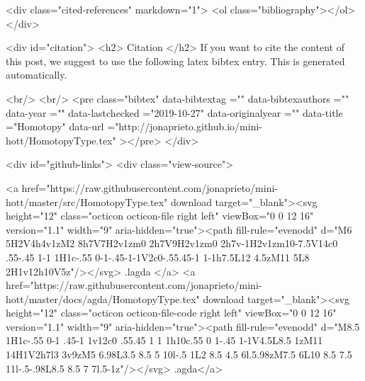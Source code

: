 {  <div class="cited-references" markdown="1">
  <ol class="bibliography"></ol>
  </div>


  
  <div id="citation">
  <h2> Citation </h2>
  If you want to cite the content of this post,
  we suggest to use the following latex bibtex entry.
  This is generated automatically.

  <br/>
  <br/>
  <pre class="bibtex"
       data-bibtextag =""
       data-bibtexauthors =""
       data-year =""
       data-lastchecked ="2019-10-27"
       data-originalyear =""
       data-title ="Homotopy"
       data-url ="http://jonaprieto.github.io/mini-hott/HomotopyType.tex"
  ></pre>
  </div>
  

  <div id="github-links">
    <div class="view-source">
      
        <a href="https://raw.githubusercontent.com/jonaprieto/mini-hott/master/src/HomotopyType.tex" download target="_blank"><svg height="12" class="octicon octicon-file right left" viewBox="0 0 12 16" version="1.1" width="9" aria-hidden="true"><path fill-rule="evenodd" d="M6 5H2V4h4v1zM2 8h7V7H2v1zm0 2h7V9H2v1zm0 2h7v-1H2v1zm10-7.5V14c0 .55-.45 1-1 1H1c-.55 0-1-.45-1-1V2c0-.55.45-1 1-1h7.5L12 4.5zM11 5L8 2H1v12h10V5z"/></svg> .lagda </a>
        <a href="https://raw.githubusercontent.com/jonaprieto/mini-hott/master/docs/agda/HomotopyType.tex" download target="_blank"><svg height="12" class="octicon octicon-file-code right left" viewBox="0 0 12 16" version="1.1" width="9" aria-hidden="true"><path fill-rule="evenodd" d="M8.5 1H1c-.55 0-1 .45-1 1v12c0 .55.45 1 1 1h10c.55 0 1-.45 1-1V4.5L8.5 1zM11 14H1V2h7l3 3v9zM5 6.98L3.5 8.5 5 10l-.5 1L2 8.5 4.5 6l.5.98zM7.5 6L10 8.5 7.5 11l-.5-.98L8.5 8.5 7 7l.5-1z"/></svg> .agda</a>
      
}
